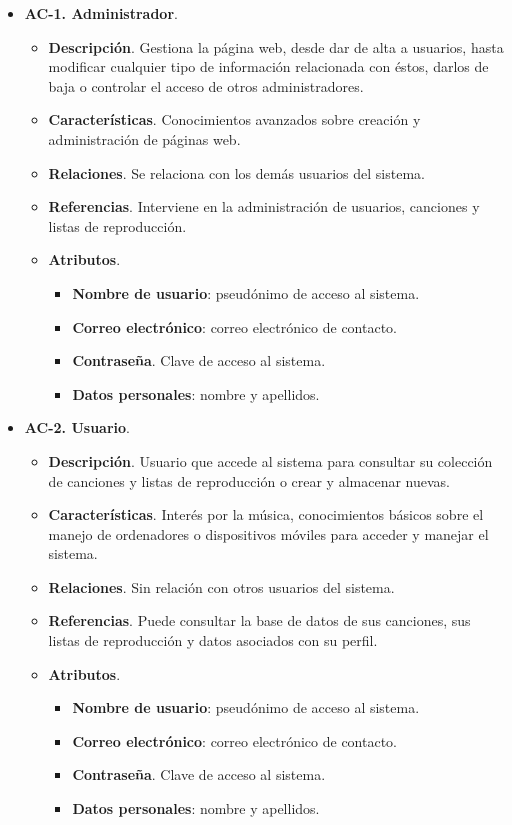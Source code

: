 \begin{itemize}
	\item \textbf{AC-1. Administrador}.
	\begin{itemize}
		\item \textbf{Descripción}. Gestiona la página web, desde dar de alta a usuarios, hasta modificar cualquier tipo de información relacionada con éstos, darlos de baja o controlar el acceso de otros administradores.
		\item \textbf{Características}. Conocimientos avanzados sobre creación y administración de páginas web.
		\item \textbf{Relaciones}. Se relaciona con los demás usuarios del sistema.
		\item \textbf{Referencias}. Interviene en la administración de usuarios, canciones y listas de reproducción.
		\item \textbf{Atributos}.
		\begin{itemize}
			\item \textbf{Nombre de usuario}: pseudónimo de acceso al sistema.
			\item \textbf{Correo electrónico}: correo electrónico de contacto.
			\item \textbf{Contraseña}. Clave de acceso al sistema.
			\item \textbf{Datos personales}: nombre y apellidos.
		\end{itemize}
	\end{itemize}
	
	\item \textbf{AC-2. Usuario}.
	\begin{itemize}
		\item \textbf{Descripción}. Usuario que accede al sistema para consultar su colección de canciones y listas de reproducción o crear y almacenar nuevas.
		\item \textbf{Características}. Interés por la música, conocimientos básicos sobre el manejo de ordenadores o dispositivos móviles para acceder y manejar el sistema.
		\item \textbf{Relaciones}. Sin relación con otros usuarios del sistema.
		\item \textbf{Referencias}. Puede consultar la base de datos de sus canciones, sus listas de reproducción y datos asociados con su perfil.
		\item \textbf{Atributos}.
		\begin{itemize}
			\item \textbf{Nombre de usuario}: pseudónimo de acceso al sistema.
			\item \textbf{Correo electrónico}: correo electrónico de contacto.
			\item \textbf{Contraseña}. Clave de acceso al sistema.
			\item \textbf{Datos personales}: nombre y apellidos.
		\end{itemize}
	\end{itemize}
\end{itemize}

